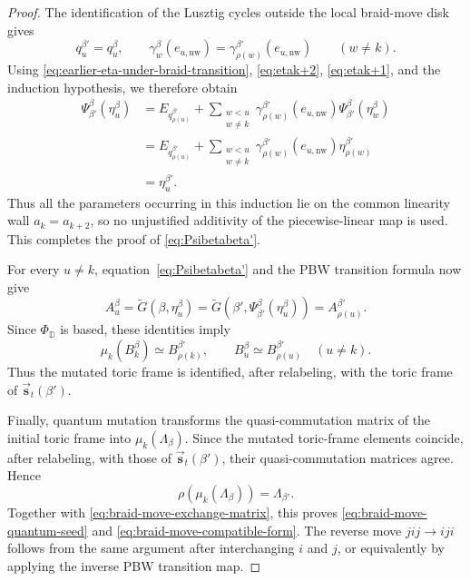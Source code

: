 \documentclass[12pt, reqno]{amsart}
\theoremstyle{plain}
\theoremstyle{definition}
\numberwithin{equation}{section}
\newcommand{\DD}{\mathbb{D}}
\newcommand{\w}{\operatorname{W}}
\begin{document}
\begin{proof}
The identification of the Lusztig cycles outside the local
braid-move disk gives
\[
    q_{u}^{\beta'}=q_u^\beta,
    \qquad
    \gamma_w^\beta(e_{u,\mathrm{nw}})
    =
    \gamma_{\rho(w)}^{\beta'}
        (e_{u,\mathrm{nw}})
    \qquad(w\neq k).
\]
Using \eqref{eq:earlier-eta-under-braid-transition},
\eqref{eq:etak+2}, \eqref{eq:etak+1}, and the induction hypothesis,
we therefore obtain
\begin{align*}
    \Psi_{\beta'}^\beta(\eta_u^\beta)
    &=
    E_{q_{\rho(u)}^{\beta'}}
    +
    \sum_{\substack{w<u\\w\neq k}}
        \gamma_{\rho(w)}^{\beta'}
            (e_{u,\mathrm{nw}})
        \Psi_{\beta'}^\beta(\eta_w^\beta)\\
    &=
    E_{q_{\rho(u)}^{\beta'}}
    +
    \sum_{\substack{w<u\\w\neq k}}
        \gamma_{\rho(w)}^{\beta'}
            (e_{u,\mathrm{nw}})
        \eta_{\rho(w)}^{\beta'}\\
    &=
    \eta_{u}^{\beta'}.
\end{align*}
Thus all the parameters occurring in this induction lie on the
common linearity wall \(a_k=a_{k+2}\), so no unjustified additivity
of the piecewise-linear map is used. This completes the proof of
\eqref{eq:Psibetabeta'}.


For every \(u\neq k\), equation~\eqref{eq:Psibetabeta'} and the PBW
transition formula now give
\[
    A_u^\beta
    =
    \widetilde G(\beta,\eta_u^\beta)
    =
    \widetilde G\left(
        \beta',
        \Psi_{\beta'}^\beta(\eta_u^\beta)
    \right)
    =
    A_{\rho(u)}^{\beta'}.
\]
Since \(\Phi_{\DD}\) is based, these identities imply
\[
    \mu_k(B_k^\beta)
    \simeq
    B_{\rho(k)}^{\beta'},
    \qquad
    B_u^\beta
    \simeq
    B_{\rho(u)}^{\beta'}
    \quad (u\neq k).
\]
Thus the mutated toric frame is identified, after relabeling, with
the toric frame of
\(\overrightarrow{\mathbf s}_t(\beta')\).

Finally, quantum mutation transforms the quasi-commutation matrix of
the initial toric frame into \(\mu_k(\Lambda_\beta)\). Since the
mutated toric-frame elements coincide, after relabeling, with those
of \(\overrightarrow{\mathbf s}_t(\beta')\), their
quasi-commutation matrices agree. Hence
\[
    \rho\!\left(\mu_k(\Lambda_\beta)\right)
    =
    \Lambda_{\beta'}.
\]
Together with \eqref{eq:braid-move-exchange-matrix}, this proves
\eqref{eq:braid-move-quantum-seed} and
\eqref{eq:braid-move-compatible-form}. The reverse move
\(jij\to iji\) follows from the same argument after interchanging
\(i\) and \(j\), or equivalently by applying the inverse PBW
transition map.
\end{proof}
\end{document}
